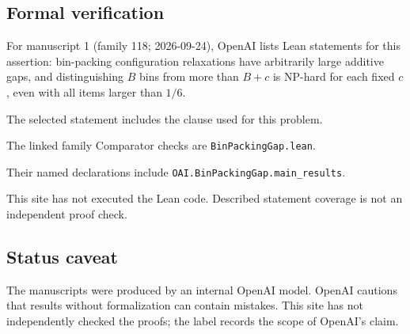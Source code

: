 \documentclass[11pt]{article}
\begin{document}
\subsection{Formal verification}
For manuscript 1 (family 118; 2026-09-24), OpenAI lists Lean statements for this assertion: bin-packing configuration relaxations have arbitrarily large additive gaps, and distinguishing $B$ bins from more than $B+c$ is NP-hard for each fixed $c$, even with all items larger than $1/6$.

The selected statement includes the clause used for this problem.

The linked family Comparator checks are \texttt{BinPackingGap.lean}.

Their named declarations include \texttt{OAI.BinPackingGap.main\_results}.

This site has not executed the Lean code. Described statement coverage is not an independent proof check.

\subsection{Status caveat}
The manuscripts were produced by an internal OpenAI model. OpenAI cautions that results without formalization can contain mistakes. This site has not independently checked the proofs; the label records the scope of OpenAI's claim.
\end{document}
